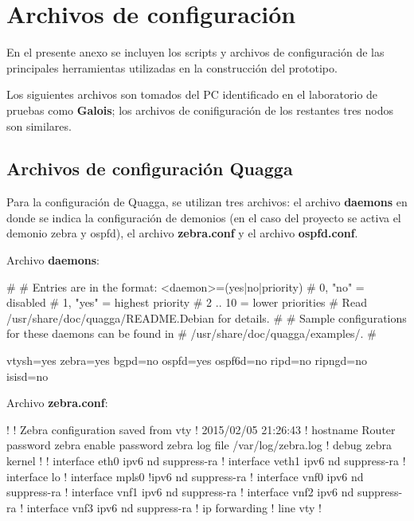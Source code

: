 
\chapter{Archivos de configuración}

En el presente anexo se incluyen los scripts y archivos de configuraci\'on de las principales herramientas utilizadas en la construcción del prototipo.

Los siguientes archivos son tomados del PC identificado en el laboratorio de pruebas como \textbf{Galois}; los archivos de conifiguraci\'on de los restantes tres nodos son similares.

\section{Archivos de configuraci\'on Quagga}
Para la configuración de Quagga, se utilizan tres archivos: el archivo \textbf{daemons} en donde se indica la configuraci\'on de demonios (en el caso del proyecto se activa el demonio zebra y ospfd), el archivo \textbf{zebra.conf} y el archivo \textbf{ospfd.conf}.

\vspace{1cm}
Archivo \textbf{daemons}:
\begin{bash}
#
# Entries are in the format: <daemon>=(yes|no|priority)
#   0, "no"  = disabled
#   1, "yes" = highest priority
#   2 .. 10  = lower priorities
# Read /usr/share/doc/quagga/README.Debian for details.
#
# Sample configurations for these daemons can be found in
# /usr/share/doc/quagga/examples/.
#

vtysh=yes
zebra=yes
bgpd=no
ospfd=yes
ospf6d=no
ripd=no
ripngd=no
isisd=no

\end{bash}

\newpage

Archivo \textbf{zebra.conf}:
\begin{bash}
!
! Zebra configuration saved from vty
!   2015/02/05 21:26:43
!
hostname Router
password zebra
enable password zebra
log file /var/log/zebra.log
!
debug zebra kernel
!
!
interface eth0
 ipv6 nd suppress-ra
!
interface veth1
 ipv6 nd suppress-ra
!
interface lo
!
interface mpls0
 !ipv6 nd suppress-ra
!
interface vnf0
 ipv6 nd suppress-ra
!
interface vnf1
 ipv6 nd suppress-ra
!
interface vnf2
 ipv6 nd suppress-ra
!
interface vnf3
 ipv6 nd suppress-ra
!
ip forwarding
!
line vty
!
\end{bash}

